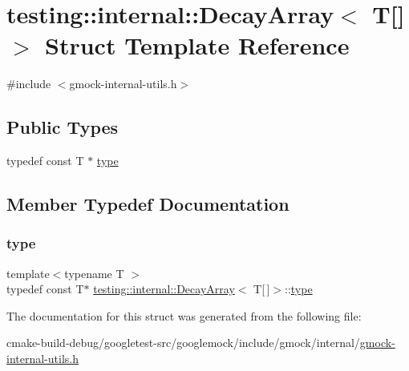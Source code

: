 \hypertarget{structtesting_1_1internal_1_1DecayArray_3_01T[]_4}{}\section{testing\+::internal\+::Decay\+Array$<$ T\mbox{[}\mbox{]}$>$ Struct Template Reference}
\label{structtesting_1_1internal_1_1DecayArray_3_01T[]_4}


{\ttfamily \#include $<$gmock-\/internal-\/utils.\+h$>$}

\subsection*{Public Types}
\begin{DoxyCompactItemize}
\item 
typedef const T $\ast$ \mbox{\hyperlink{structtesting_1_1internal_1_1DecayArray_3_01T[]_4_a1820b673d104b3a985faaef8db5d77d2}{type}}
\end{DoxyCompactItemize}


\subsection{Member Typedef Documentation}
\mbox{\label{structtesting_1_1internal_1_1DecayArray_3_01T[]_4_a1820b673d104b3a985faaef8db5d77d2}} 
\subsubsection{\texorpdfstring{type}{type}}
{\footnotesize\ttfamily template$<$typename T $>$ \\
typedef const T$\ast$ \mbox{\hyperlink{structtesting_1_1internal_1_1DecayArray}{testing\+::internal\+::\+Decay\+Array}}$<$ T\mbox{[}$\,$\mbox{]}$>$\+::\mbox{\hyperlink{structtesting_1_1internal_1_1DecayArray_3_01T[]_4_a1820b673d104b3a985faaef8db5d77d2}{type}}}



The documentation for this struct was generated from the following file\+:\begin{DoxyCompactItemize}
\item 
cmake-\/build-\/debug/googletest-\/src/googlemock/include/gmock/internal/\mbox{\hyperlink{gmock-internal-utils_8h}{gmock-\/internal-\/utils.\+h}}\end{DoxyCompactItemize}
